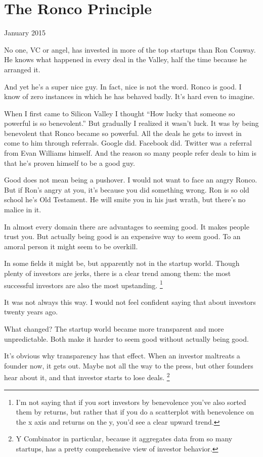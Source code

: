 \chapter{The Ronco Principle}

January 2015

No one, VC or angel, has invested in more of the top startups than Ron
Conway. He knows what happened in every deal in the Valley, half the
time because he arranged it.

And yet he's a super nice guy. In fact, nice is not the word. Ronco is
good. I know of zero instances in which he has behaved badly. It's hard
even to imagine.

When I first came to Silicon Valley I thought ``How lucky that someone
so powerful is so benevolent.'' But gradually I realized it wasn't luck.
It was by being benevolent that Ronco became so powerful. All the deals
he gets to invest in come to him through referrals. Google did. Facebook
did. Twitter was a referral from Evan Williams himself. And the reason
so many people refer deals to him is that he's proven himself to be a
good guy.

Good does not mean being a pushover. I would not want to face an angry
Ronco. But if Ron's angry at you, it's because you did something wrong.
Ron is so old school he's Old Testament. He will smite you in his just
wrath, but there's no malice in it.

In almost every domain there are advantages to seeming good. It makes
people trust you. But actually being good is an expensive way to seem
good. To an amoral person it might seem to be overkill.

In some fields it might be, but apparently not in the startup world.
Though plenty of investors are jerks, there is a clear trend among them:
the most successful investors are also the most upstanding.
\footnote{I'm not saying that if you sort investors by benevolence you've
also sorted them by returns, but rather that if you do a scatterplot
with benevolence on the x axis and returns on the y, you'd see a clear
upward trend.}

It was not always this way. I would not feel confident saying that about
investors twenty years ago.

What changed? The startup world became more transparent and more
unpredictable. Both make it harder to seem good without actually being
good.

It's obvious why transparency has that effect. When an investor
maltreats a founder now, it gets out. Maybe not all the way to the
press, but other founders hear about it, and that investor starts to
lose deals. \footnote{Y Combinator in particular, because it aggregates data from so
many startups, has a pretty comprehensive view of investor behavior.}

